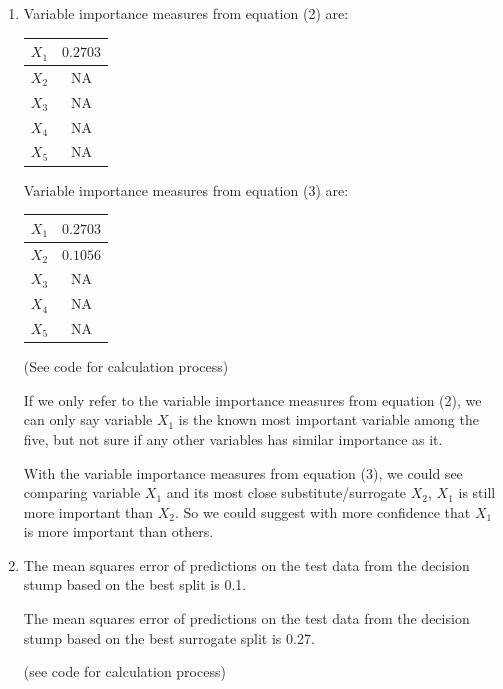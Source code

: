 \documentclass[paper=letter, fontsize=12pt]{article}
\begin{document}
\begin{enumerate}[label=(\alph*)]
\begin{enumerate}[label=(\roman*)]
		\item Variable importance measures from equation (2) are:
		
		\begin{center}
			\begin{tabular}{|c|c|}
				\hline
				$X_1$ & $0.2703$ \\ \hline
				$X_2$ & NA \\ \hline
				$X_3$ & NA \\ \hline
				$X_4$ & NA \\ \hline
				$X_5$ & NA \\ \hline
			\end{tabular}
		\end{center}
			
		Variable importance measures from equation (3) are:
		
		\begin{center}
			\begin{tabular}{|c|c|}
				\hline
				$X_1$ & $0.2703$ \\ \hline
				$X_2$ & $0.1056$ \\ \hline
				$X_3$ & NA \\ \hline
				$X_4$ & NA \\ \hline
				$X_5$ & NA \\ \hline
			\end{tabular}
		\end{center}
	
		(See code for calculation process)
	
		If we only refer to the variable importance measures from equation (2), we can only say variable $X_1$ is the known most important variable among the five, but not sure if any other variables has similar importance as it.
		
		With the variable importance measures from equation (3), we could see comparing variable $X_1$ and its most close substitute/surrogate $X_2$, $X_1$ is still more important than $X_2$. So we could suggest with more confidence that $X_1$ is more important than others.
		
		\item 
		The mean squares error of predictions on the test data from the decision stump based on the best split is 0.1.
		
		The mean squares error of predictions on the test data from the decision stump based on the best surrogate split is 0.27. 
		
		(see code for calculation process)
		
	\end{enumerate}


\end{enumerate}
\end{document}
